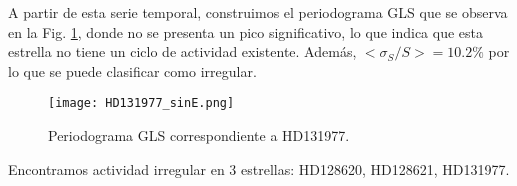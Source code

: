 \documentclass[baaa]{baaa}
\begin{document}
A partir de esta serie temporal, construimos el periodograma GLS que se observa en la Fig. \ref{hd131977P}, donde no se presenta un pico significativo, lo que indica que esta estrella no tiene un ciclo de actividad existente. Además, $<\sigma_S/S>=10.2\%$ por lo que se puede clasificar como irregular.

\begin{figure}[hbt!]
\centering
\texttt{[image: HD131977\_sinE.png]}
\caption{Periodograma GLS correspondiente a HD131977.}
\label{hd131977P}
\end{figure}

Encontramos actividad irregular en 3 estrellas: HD128620, HD128621, HD131977. 

\end{document}
